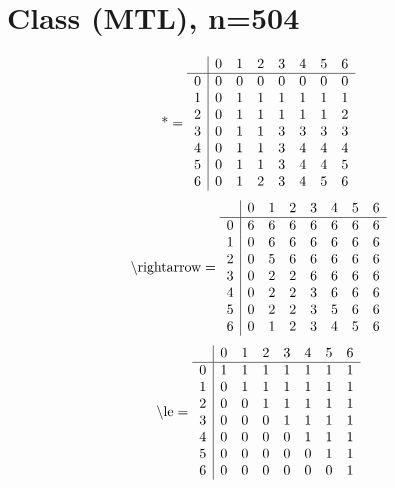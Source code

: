 \documentclass[11pt]{article}
\begin{document}
\section{Class (MTL), n=504}
\[\text{*} = 
\begin{array}{r | r r r r r r r}
 & 0 & 1 & 2 & 3 & 4 & 5 & 6 \\ \hline
0 & 0 & 0 & 0 & 0 & 0 & 0 & 0 \\
1 & 0 & 1 & 1 & 1 & 1 & 1 & 1 \\
2 & 0 & 1 & 1 & 1 & 1 & 1 & 2 \\
3 & 0 & 1 & 1 & 3 & 3 & 3 & 3 \\
4 & 0 & 1 & 1 & 3 & 4 & 4 & 4 \\
5 & 0 & 1 & 1 & 3 & 4 & 4 & 5 \\
6 & 0 & 1 & 2 & 3 & 4 & 5 & 6 \\
\end{array}
\]
\[\text{\textbackslash rightarrow} = 
\begin{array}{r | r r r r r r r}
 & 0 & 1 & 2 & 3 & 4 & 5 & 6 \\ \hline
0 & 6 & 6 & 6 & 6 & 6 & 6 & 6 \\
1 & 0 & 6 & 6 & 6 & 6 & 6 & 6 \\
2 & 0 & 5 & 6 & 6 & 6 & 6 & 6 \\
3 & 0 & 2 & 2 & 6 & 6 & 6 & 6 \\
4 & 0 & 2 & 2 & 3 & 6 & 6 & 6 \\
5 & 0 & 2 & 2 & 3 & 5 & 6 & 6 \\
6 & 0 & 1 & 2 & 3 & 4 & 5 & 6 \\
\end{array}
\]
\[\text{\textbackslash le} = 
\begin{array}{r | r r r r r r r}
 & 0 & 1 & 2 & 3 & 4 & 5 & 6 \\ \hline
0 & 1 & 1 & 1 & 1 & 1 & 1 & 1 \\
1 & 0 & 1 & 1 & 1 & 1 & 1 & 1 \\
2 & 0 & 0 & 1 & 1 & 1 & 1 & 1 \\
3 & 0 & 0 & 0 & 1 & 1 & 1 & 1 \\
4 & 0 & 0 & 0 & 0 & 1 & 1 & 1 \\
5 & 0 & 0 & 0 & 0 & 0 & 1 & 1 \\
6 & 0 & 0 & 0 & 0 & 0 & 0 & 1 \\
\end{array}
\]
\end{document}
